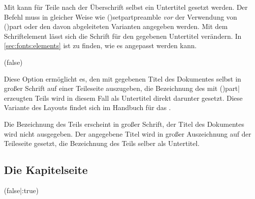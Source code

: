 \begin{DeclareEntity*}{}
\begin{DeclareEntity*}{}
\begin{DeclareEntity*}{}
\begin{Declaration}
\begin{Declaration}
Mit  kann für Teile nach der 
Überschrift selbst ein Untertitel gesetzt werden. Der Befehl muss in gleicher 
Weise wie \Macro(){setpartpreamble}
\emph{vor} der Verwendung von 
\Macro(){part} 
oder den davon abgeleiteten Varianten angegeben werden. Mit dem Schriftelement 
 lässt sich die Schrift für den gegebenen Untertitel 
verändern. In \autoref{sec:fonts:elements} ist zu finden, wie es angepasst 
werden kann.
\end{Declaration}
\end{Declaration}

\begin{Declaration}
  {}
  (false)
\printdeclarationlist

Diese Option ermöglicht es, den mit  gegebenen Titel des 
Dokumentes selbst in großer Schrift auf einer Teileseite auszugeben, die 
Bezeichnung des mit 
\Macro(){part|} 
erzeugten Teils wird in diesem Fall als Untertitel direkt darunter gesetzt. 
Diese Variante des Layouts findet sich im Handbuch für das \TUDCD. 
\notudscrartcl
%
\begin{DeclareValues}{}
  Die Bezeichnung des Teils erscheint in großer Schrift, der Titel des 
  Dokumentes wird nicht ausgegeben.
  Der angegebene Titel wird in großer Auszeichnung auf der Teileseite gesetzt,
  die Bezeichnung des Teils selber als Untertitel.
\end{DeclareValues}
\end{Declaration}
%
%



\subsection{%
  Die Kapitelseite%
  \label{sec:chapter}%
}

\begin{Declaration}
  {}
  (false|:true)


\end{Declaration}
\end{DeclareEntity*}
\end{DeclareEntity*}
\end{DeclareEntity*}
